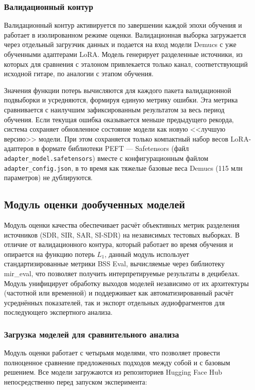 \documentclass[14pt]{extarticle}
\begin{document}
\subsubsection{Валидационный контур}
Валидационный контур активируется по завершении каждой эпохи обучения и работает в изолированном режиме оценки. 
Валидационная выборка загружается через отдельный загрузчик данных и подается на вход модели Demucs с уже обученными 
адаптерами LoRA. 
Модель генерирует разделенные источники, из которых для сравнения с эталоном привлекается только канал, 
соответствующий исходной гитаре, по аналогии с этапом обучения.

Значения функции потерь вычисляются для каждого пакета валидационной подвыборки и усредняются, формируя единую 
метрику ошибки. Эта метрика сравнивается с наилучшим зафиксированным результатом за весь период обучения. 
Если текущая ошибка оказывается меньше предыдущего рекорда, система сохраняет обновленное состояние модели 
как новую <<лучшую версию>> модели. 
При этом сохраняется только компактный набор весов LoRA-адаптеров в формате библиотеки PEFT --- Safetensors 
(файл \texttt{adapter\_model.safetensors}) вместе с конфигурационным файлом \texttt{adapter\_config.json}, 
в то время как 
тяжелые базовые веса Demucs (115 млн параметров) не дублируются. 


\subsection{Модуль оценки дообученных моделей}
Модуль оценки качества обеспечивает расчёт объективных метрик разделения источников (SDR, SIR, SAR, SI-SDR) 
на независимых тестовых выборках. 
В отличие от валидационного контура, который работает во время обучения и опирается на функцию потерь $L_1$,
данный модуль использует стандартизированные метрики BSS Eval, вычисляемые через библиотеку mir\_eval,
что позволяет получить интерпретируемые результаты в децибелах.
Модуль унифицирует обработку выходов моделей независимо от их архитектуры (частотной или временной) и
поддерживает как автоматизированный расчёт усреднённых показателей, так и экспорт отдельных аудиофрагментов
для последующего экспертного анализа.

\subsubsection{Загрузка моделей для сравнительного анализа}
Модуль оценки работает с четырьмя моделями, что позволяет провести полноценное сравнение предложенных подходов между 
собой и с базовым решением. Все модели загружаются из репозиториев Hugging Face Hub непосредственно перед запуском эксперимента:
\end{document}
